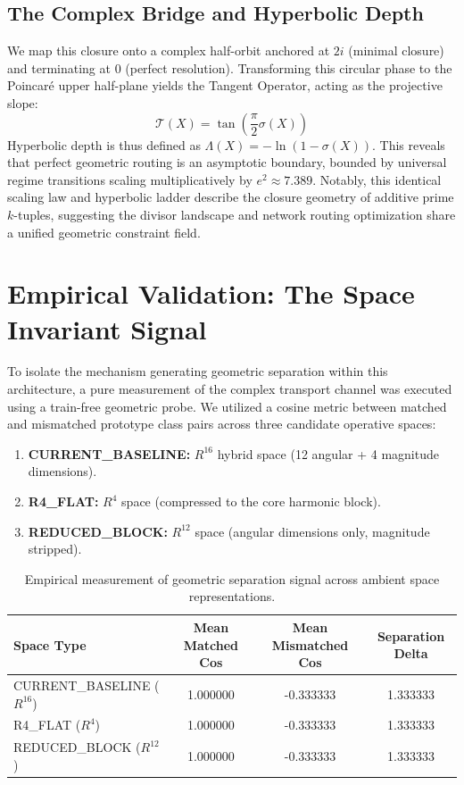 \documentclass[11pt,twoside,a4paper]{article}
\begin{document}
\subsection{The Complex Bridge and Hyperbolic Depth}
We map this closure onto a complex half-orbit anchored at $2i$ (minimal closure) and terminating at $0$ (perfect resolution). Transforming this circular phase to the Poincar\'{e} upper half-plane yields the Tangent Operator, acting as the projective slope:
\begin{equation}
\mathcal{T}(X) = \tan\left(\frac{\pi}{2}\sigma(X)\right)
\end{equation}
Hyperbolic depth is thus defined as $\Lambda(X) = -\ln(1 - \sigma(X))$. This reveals that perfect geometric routing is an asymptotic boundary, bounded by universal regime transitions scaling multiplicatively by $e^2 \approx 7.389$. Notably, this identical scaling law and hyperbolic ladder describe the closure geometry of additive prime $k$-tuples, suggesting the divisor landscape and network routing optimization share a unified geometric constraint field.

\section{Empirical Validation: The Space Invariant Signal}
To isolate the mechanism generating geometric separation within this architecture, a pure measurement of the complex transport channel was executed using a train-free geometric probe. We utilized a cosine metric between matched and mismatched prototype class pairs across three candidate operative spaces:
\begin{enumerate}
    \item \textbf{CURRENT\_BASELINE:} $R^{16}$ hybrid space (12 angular + 4 magnitude dimensions).
    \item \textbf{R4\_FLAT:} $R^4$ space (compressed to the core harmonic block).
    \item \textbf{REDUCED\_BLOCK:} $R^{12}$ space (angular dimensions only, magnitude stripped).
\end{enumerate}

\begin{table}[h]
\centering
\begin{tabular}{lccc}
\toprule
\textbf{Space Type} & \textbf{Mean Matched Cos} & \textbf{Mean Mismatched Cos} & \textbf{Separation Delta} \\
\midrule
CURRENT\_BASELINE ($R^{16}$) & 1.000000 & -0.333333 & 1.333333 \\
R4\_FLAT ($R^4$)            & 1.000000 & -0.333333 & 1.333333 \\
REDUCED\_BLOCK ($R^{12}$)   & 1.000000 & -0.333333 & 1.333333 \\
\bottomrule
\end{tabular}
\caption{Empirical measurement of geometric separation signal across ambient space representations.}
\label{tab:signal_probe}
\end{table}
\end{document}
